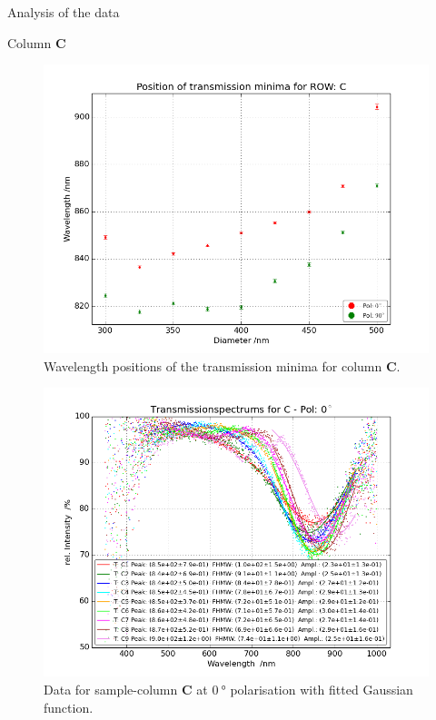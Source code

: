 \documentclass[pdftex, a4paper,11pt, twoside, UKenglish]{report}
\begin{document}
\begin{chapter}{Analysis of the data}
\begin{section}{Column \textbf{C}}
      \begin{figure}[b!]
        \centering
        \includegraphics[width=\textwidth]{Figures/MinimaPosC.png}
        \caption{Wavelength positions of the transmission minima for column
            \textbf{C}.}
        \label{fig:MinimaPosC}
      \end{figure}
      \newpage
      \begin{figure}[ht!]
        \centering
        \begin{minipage}{.95\textwidth}
          \centering
          \includegraphics[width=\textwidth]
              {Figures/TransspecFIT_CPol0.png}
          \caption{Data for sample-column \textbf{C} at $\SI{0}{\degree}$
              polarisation with fitted Gaussian function.}

\end{minipage}
\end{figure}
\end{section}
\end{chapter}
\end{document}

